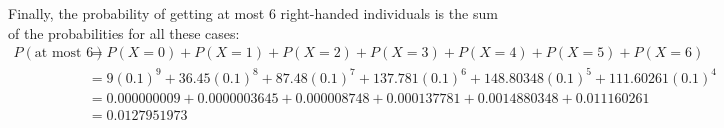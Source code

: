 \documentclass[journal,12pt,onecolumn]{IEEEtran}
\theoremstyle{remark}
\begin{document}
Finally, the probability of getting at most 6 right-handed individuals is the sum of the probabilities for all these cases:
\begin{align}
P(\text{at most 6}) &= P(X = 0) + P(X = 1) + P(X = 2) + P(X = 3) + P(X = 4) + P(X = 5) + P(X = 6)\\
&=9(0.1)^{9} +36.45(0.1)^{8}+87.48(0.1)^{7} + 137.781(0.1)^{6}+148.80348(0.1)^{5}+111.60261(0.1)^{4}\\
&=0.000000009 + 0.0000003645+0.000008748+0.000137781+0.0014880348+0.011160261 \\
&=0.0127951973
\end{align}
\end{document}
